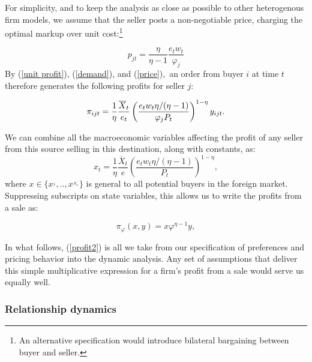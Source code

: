 \documentclass[12pt]{article}
\begin{document}
For simplicity, and to keep the analysis as close as possible to other
heterogenous firm models, we assume that the seller posts a non-negotiable
price, charging the optimal markup over unit cost:\footnote{%
An alternative specification would introduce bilateral bargaining between
buyer and seller.\medskip}

\begin{equation}
p_{jt}=\frac{\eta }{\eta -1}\frac{e_{t}w_{t}}{\varphi _{j}}  \label{price}
\end{equation}%
By (\ref{unit profit}), (\ref{demand}), and (\ref{price}),\ an order from
buyer $i$ at time $t$ therefore generates the following profits for seller $%
j $:

\begin{equation*}
\pi _{ijt}=\frac{1}{\eta }\frac{\overline{X}_{t}}{e_{t}}\left( \frac{%
e_{t}w_{t}\eta /(\eta -1)}{\varphi _{j}P_{t}}\right) ^{1-\eta }y_{ijt}.
\end{equation*}

We can combine all the macroeconomic variables affecting the profit of any
seller from this source selling in this destination, along with constants,
as:%
\begin{equation*}
x_{t}=\frac{1}{\eta }\frac{\overline{X}_{t}}{e}\left( \frac{e_{t}w_{t}\eta
/(\eta -1)}{P_{t}}\right) ^{1-\eta },
\end{equation*}%
where $x\in \{x^{_{1}},..,x^{_{N_{x}}}\}$ is general to all potential buyers
in the foreign market. Suppressing subscripts on state variables, this
allows us to write the profits from a sale as:

\begin{equation}
\pi _{\varphi }(x,y)=x\varphi ^{\eta -1}y,  \label{profit2}
\end{equation}
\qquad \qquad

In what follows, (\ref{profit2}) is all we take from our specification of
preferences and pricing behavior into the dynamic analysis. Any set of
assumptions that deliver this simple multiplicative expression for a firm's
profit from a sale would serve us equally well.

\subsubsection{Relationship dynamics}
\end{document}
